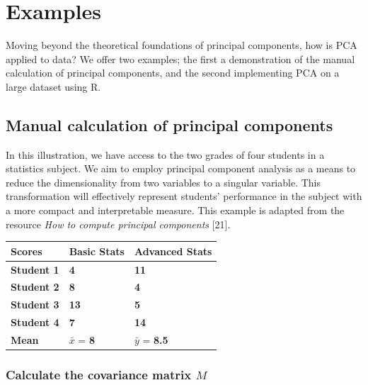 \documentclass[
  letterpaper,
  DIV=11,
  numbers=noendperiod]{scrreprt}
\begin{document}

\hypertarget{examples}{%
\chapter{Examples}\label{examples}}

Moving beyond the theoretical foundations of principal components, how
is PCA applied to data? We offer two examples; the first a demonstration
of the manual calculation of principal components, and the second
implementing PCA on a large dataset using R.

\hypertarget{manual-calculation-of-principal-components}{%
\section{Manual calculation of principal
components}\label{manual-calculation-of-principal-components}}

In this illustration, we have access to the two grades of four students
in a statistics subject. We aim to employ principal component analysis
as a means to reduce the dimensionality from two variables to a singular
variable. This transformation will effectively represent students'
performance in the subject with a more compact and interpretable
measure. This example is adapted from the resource \emph{How to compute
principal components} {[}21{]}.

\begin{longtable}[]{@{}lll@{}}
\toprule\noalign{}
Scores & \textbf{Basic Stats} & \textbf{Advanced Stats} \\
\midrule\noalign{}
\endhead
\bottomrule\noalign{}
\endlastfoot
\textbf{Student 1} & \textbf{4} & \textbf{11} \\
\textbf{Student 2} & \textbf{8} & \textbf{4} \\
\textbf{Student 3} & \textbf{13} & \textbf{5} \\
\textbf{Student 4} & \textbf{7} & \textbf{14} \\
\textbf{Mean} & \(\bar{x}\) = \textbf{8} & \(\bar{y}\) = \textbf{8.5} \\
\end{longtable}

\hypertarget{calculate-the-covariance-matrix-m}{%
\subsection{\texorpdfstring{Calculate the covariance matrix
\(M\)}{Calculate the covariance matrix M}}\label{calculate-the-covariance-matrix-m}}
\end{document}
